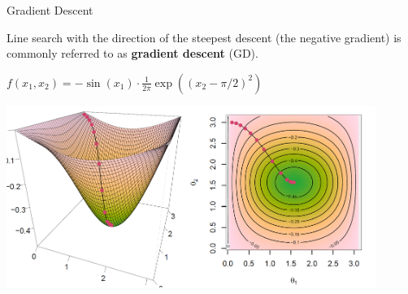 \documentclass[11pt,compress,t,notes=noshow, xcolor=table]{beamer}
\begin{document}

\begin{vbframe}{Gradient Descent}

	Line search with the direction of the steepest descent (the negative gradient) is commonly referred to as \textbf{gradient descent} (GD). 

	\begin{center}
		$f(x_1, x_2) = - \sin(x_1) \cdot \frac{1}{2\pi} \exp\left( (x_2 - \pi / 2)^2 \right)$

		\begin{center}
			\includegraphics[width = 0.9\textwidth]{figure_man/example-descent1.png}
		\end{center}
		
	\end{center}

\end{vbframe}


\end{document}
